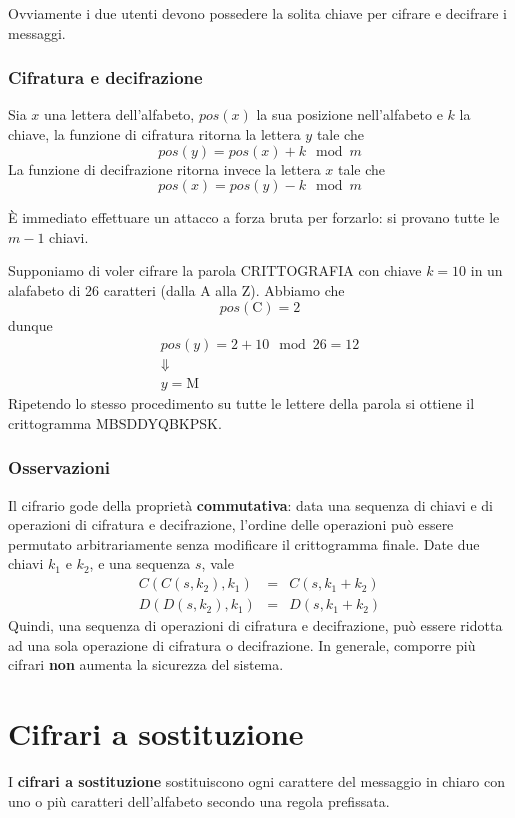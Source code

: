 Ovviamente i due utenti devono possedere la solita chiave per cifrare e decifrare i messaggi.

\subsubsection{Cifratura e decifrazione}
Sia $x$ una lettera dell'alfabeto, $pos(x)$ la sua posizione nell'alfabeto e $k$ la chiave, la funzione di cifratura
ritorna la lettera $y$ tale che
\[ pos(y) = pos(x) + k \mod{m} \]
La funzione di decifrazione ritorna invece la lettera $x$ tale che
\[ pos(x) = pos(y) - k \mod{m} \]

\`E immediato effettuare un attacco a forza bruta per forzarlo: si provano tutte le $m - 1$ chiavi.

\begin{example}
	Supponiamo di voler cifrare la parola CRITTOGRAFIA con chiave $k = 10$ in un alafabeto di 26 caratteri (dalla A alla
	Z). Abbiamo che
	\[ pos(\text{C}) = 2 \]
	dunque
	\begin{gather*}
		pos(y) = 2 + 10 \mod{26} = 12 \\
		\Downarrow \\
		y = \text{M}
	\end{gather*}
	Ripetendo lo stesso procedimento su tutte le lettere della parola si ottiene il crittogramma MBSDDYQBKPSK.
\end{example}

\subsubsection{Osservazioni}
Il cifrario gode della propriet\`a \textbf{commutativa}: data una sequenza di chiavi e di operazioni di cifratura e
decifrazione, l'ordine delle operazioni pu\`o essere permutato arbitrariamente senza modificare il crittogramma finale.
Date due chiavi $k_1$ e $k_2$, e una sequenza $s$, vale
\[
	\begin{matrix}
		C(C(s, k_2), k_1) & = & C(s, k_1 + k_2) \\
		D(D(s, k_2), k_1) & = & D(s, k_1 + k_2)
	\end{matrix}
\]
Quindi, una sequenza di operazioni di cifratura e decifrazione, pu\`o essere ridotta ad una sola operazione di cifratura
o decifrazione. In generale, comporre pi\`u cifrari \textbf{non} aumenta la sicurezza del sistema.

\section{Cifrari a sostituzione}\label{sostituzione}
I \textbf{cifrari a sostituzione} sostituiscono ogni carattere del messaggio in chiaro con uno o pi\`u caratteri
dell'alfabeto secondo una regola prefissata.

